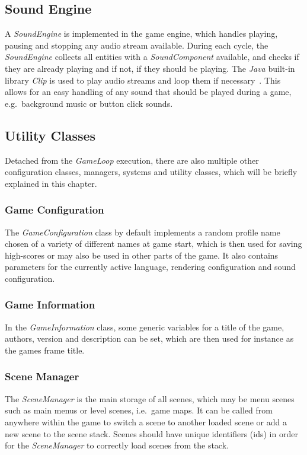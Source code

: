 \subsection{Sound Engine}\label{subsec:sound-engine}
A \textit{SoundEngine} is implemented in the game engine, which handles playing, pausing and stopping any audio stream available.
During each cycle, the \textit{SoundEngine} collects all entities with a \textit{SoundComponent} available, and checks if they are already playing and if not, if they should be playing.
The \textit{Java} built-in library \textit{Clip} is used to play audio streams and loop them if necessary~\cite{clip}.
This allows for an easy handling of any sound that should be played during a game, e.g.\ background music or button click sounds.

\subsection{Utility Classes}\label{subsec:utility-classes}
Detached from the \textit{GameLoop} execution, there are also multiple other configuration classes, managers, systems and utility classes, which will be briefly explained in this chapter.
\subsubsection{Game Configuration}\label{subsubsec:game-configuration}
The \textit{GameConfiguration} class by default implements a random profile name chosen of a variety of different names at game start, which is then used for saving high-scores
or may also be used in other parts of the game.
It also contains parameters for the currently active language, rendering configuration and sound configuration.

\subsubsection{Game Information}\label{subsubsec:game-information}
In the \textit{GameInformation} class, some generic variables for a title of the game, authors, version and description can be set, which are then used for instance as the games frame
title.

\subsubsection{Scene Manager}\label{subsubsec:scene-manager}
The \textit{SceneManager} is the main storage of all scenes, which may be menu scenes such as main menus or level scenes, i.e.\ game maps.
It can be called from anywhere within the game to switch a scene to another loaded scene or add a new scene to the scene stack.
Scenes should have unique identifiers (ids) in order for the \textit{SceneManager} to correctly load scenes from the stack.
